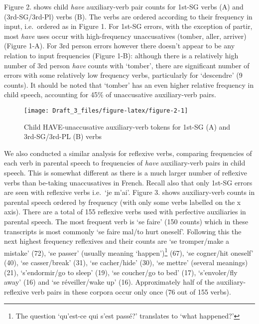 \documentclass[
  12pt,
]{article}
\begin{document}
\begin{enumerate}[resume*]
\begin{enumerate}[resume*]
\begin{enumerate}[resume*]
\begin{enumerate}[resume*]
\begin{enumerate}[resume*]
Figure 2. shows child \emph{have} auxiliary-verb pair counts for 1st-SG verbs (A) and (3rd-SG/3rd-Pl) verbs (B). The verbs are ordered according to their frequency in input, i.e.~ordered as in Figure 1. For 1st-SG errors, with the exception of partir, most \emph{have} uses occur with high-frequency unaccusatives (tomber, aller, arriver) (Figure 1-A). For 3rd person errors however there doesn't appear to be any relation to input frequencies (Figure 1-B): although there is a relatively high number of 3rd person \emph{have} counts with `tomber', there are significant number of errors with some relatively low frequency verbs, particularly for `descendre' (9 counts). It should be noted that `tomber' has an even higher relative frequency in child speech, accounting for 45\% of unaccusative auxiliary-verb pairs.

\begin{figure}

{\centering \texttt{[image: Draft\_3\_files/figure-latex/figure-2-1]} 

}

\caption{Child HAVE-unaccusative auxiliary-verb tokens for 1st-SG (A) and 3rd-SG/3rd-PL (B) verbs}\label{fig:figure-2}
\end{figure}

We also conducted a similar analysis for reflexive verbs, comparing frequencies of each verb in parental speech to frequencies of \emph{have} auxiliary-verb pairs in child speech. This is somewhat different as there is a much larger number of reflexive verbs than be-taking unaccusatives in French. Recall also that only 1st-SG errors are seen with reflexive verbs i.e.~`je m'ai'. Figure 3. shows auxiliary-verb counts in parental speech ordered by frequency (with only some verbs labelled on the x axis). There are a total of 155 reflexive verbs used with perfective auxiliaries in parental speech. The most frequent verb is `se faire' (150 counts) which in these transcripts is most commonly `se faire mal/to hurt oneself'. Following this the next highest frequency reflexives and their counts are `se tromper/make a mistake' (72), `se passer' (usually meaning `happen')\footnote{The question `qu'est-ce qui s'est passé?' translates to `what happened?'} (67), `se cogner/hit oneself' (40), `se casser/break' (31), `se cacher/hide' (30), `se mettre' (several meanings) (21), `s'endormir/go to sleep' (19), `se coucher/go to bed' (17), `s'envoler/fly away' (16) and `se réveiller/wake up' (16). Approximately half of the auxiliary-reflexive verb pairs in these corpora occur only once (76 out of 155 verbs).


\end{enumerate}
\end{enumerate}
\end{enumerate}
\end{enumerate}
\end{enumerate}
\end{document}
